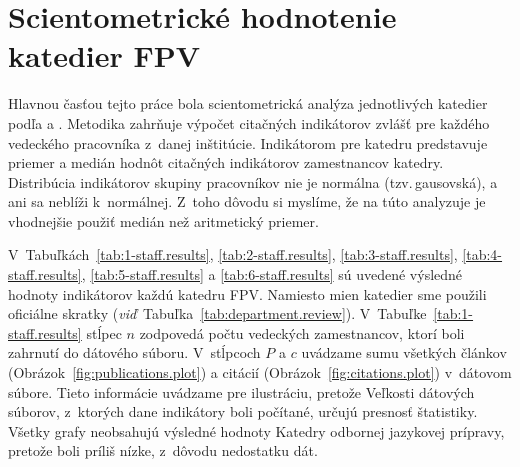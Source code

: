 \section{Scientometrické hodnotenie katedier FPV}

Hlavnou časťou tejto práce bola scientometrická analýza jednotlivých katedier
podľa \citet{Kazakis2014a} a \citet{Kazakis2014b,Kazakis2015}.  Metodika
zahrňuje výpočet citačných indikátorov zvlášť pre každého vedeckého pracovníka
z~danej inštitúcie.  Indikátorom pre katedru predstavuje priemer a medián hodnôt
citačných indikátorov zamestnancov katedry.  Distribúcia indikátorov skupiny
pracovníkov nie je normálna (tzv.\,gausovská), a ani sa neblíži k~normálnej.
Z~toho dôvodu si myslíme, že na túto analyzuje je vhodnejšie použiť medián než
aritmetický priemer.

V~Tabuľkách~\ref{tab:1-staff.results}, \ref{tab:2-staff.results},
\ref{tab:3-staff.results}, \ref{tab:4-staff.results}, \ref{tab:5-staff.results}
a \ref{tab:6-staff.results} sú uvedené výsledné hodnoty indikátorov každú
katedru FPV.  Namiesto mien katedier sme použili oficiálne skratky
(\emph{viď}~Tabuľka~\ref{tab:department.review}).
V~Tabuľke~\ref{tab:1-staff.results} stĺpec $n$ zodpovedá počtu vedeckých
zamestnancov, ktorí boli zahrnutí do dátového súboru.  V~stĺpcoch $P$ a $c$
uvádzame sumu všetkých článkov (Obrázok~\ref{fig:publications.plot}) a citácií
(Obrázok~\ref{fig:citations.plot}) v~dátovom súbore.  Tieto informácie uvádzame
pre ilustráciu, pretože Veľkosti dátových súborov, z~ktorých dane indikátory
boli počítané, určujú presnosť štatistiky.  Všetky grafy neobsahujú výsledné
hodnoty Katedry odbornej jazykovej prípravy, pretože boli príliš nízke, z~dôvodu
nedostatku dát.

